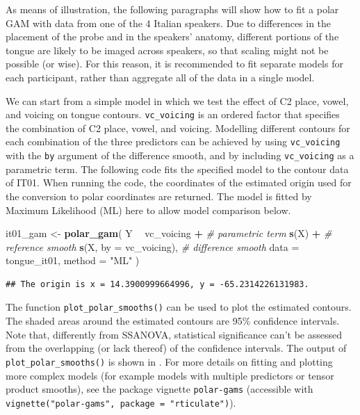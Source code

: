 \documentclass[12pt,]{article}
\newenvironment{Shaded}{\begin{snugshade}}{\end{snugshade}}
\newcommand{\CommentTok}[1]{\textcolor[rgb]{0.56,0.35,0.01}{\textit{#1}}}
\newcommand{\DataTypeTok}[1]{\textcolor[rgb]{0.13,0.29,0.53}{#1}}
\newcommand{\KeywordTok}[1]{\textcolor[rgb]{0.13,0.29,0.53}{\textbf{#1}}}
\newcommand{\NormalTok}[1]{#1}
\newcommand{\OperatorTok}[1]{\textcolor[rgb]{0.81,0.36,0.00}{\textbf{#1}}}
\newcommand{\StringTok}[1]{\textcolor[rgb]{0.31,0.60,0.02}{#1}}
\begin{document}
As means of illustration, the following paragraphs will show how to fit
a polar GAM with data from one of the 4 Italian speakers. Due to
differences in the placement of the probe and in the speakers' anatomy,
different portions of the tongue are likely to be imaged across
speakers, so that scaling might not be possible (or wise). For this
reason, it is recommended to fit separate models for each participant,
rather than aggregate all of the data in a single model.

We can start from a simple model in which we test the effect of C2
place, vowel, and voicing on tongue contours. \texttt{vc\_voicing} is an
ordered factor that specifies the combination of C2 place, vowel, and
voicing. Modelling different contours for each combination of the three
predictors can be achieved by using \texttt{vc\_voicing} with the
\texttt{by} argument of the difference smooth, and by including
\texttt{vc\_voicing} as a parametric term. The following code fits the
specified model to the contour data of IT01. When running the code, the
coordinates of the estimated origin used for the conversion to polar
coordinates are returned. The model is fitted by Maximum Likelihood (ML)
here to allow model comparison below.

\begin{Shaded}
\begin{Highlighting}[]
\NormalTok{it01_gam <-}\StringTok{ }\KeywordTok{polar_gam}\NormalTok{(}
\NormalTok{  Y }\OperatorTok{~}
\StringTok{    }\NormalTok{vc_voicing }\OperatorTok{+}\StringTok{            }\CommentTok{# parametric term}
\StringTok{    }\KeywordTok{s}\NormalTok{(X) }\OperatorTok{+}\StringTok{                  }\CommentTok{# reference smooth}
\StringTok{    }\KeywordTok{s}\NormalTok{(X, }\DataTypeTok{by =}\NormalTok{ vc_voicing),  }\CommentTok{# difference smooth}
  \DataTypeTok{data =}\NormalTok{ tongue_it01,}
  \DataTypeTok{method =} \StringTok{"ML"}
\NormalTok{)}
\end{Highlighting}
\end{Shaded}

\begin{verbatim}
## The origin is x = 14.3900999664996, y = -65.2314226131983.
\end{verbatim}

The function \texttt{plot\_polar\_smooths()} can be used to plot the
estimated contours. The shaded areas around the estimated contours are
95\% confidence intervals. Note that, differently from SSANOVA,
statistical significance can't be assessed from the overlapping (or lack
thereof) of the confidence intervals. The output of
\texttt{plot\_polar\_smooths()} is shown in . For
more details on fitting and plotting more complex models (for example
models with multiple predictors or tensor product smooths), see the
package vignette \texttt{polar-gams} (accessible with
\texttt{vignette("polar-gams",\ package\ =\ "rticulate")}).
\end{document}
